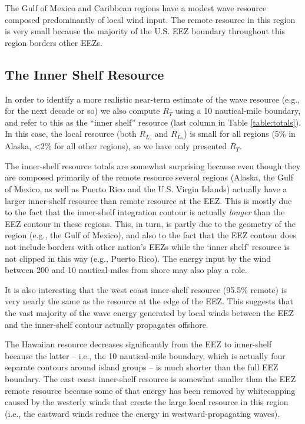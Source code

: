The Gulf of Mexico and Caribbean regions have a modest wave resource composed predominantly of local wind input. The remote resource in this region is very small because the majority of the U.S. EEZ boundary throughout this region borders other EEZs. 

\subsection{The Inner Shelf Resource}

In order to identify a more realistic near-term estimate of the wave resource (e.g., for the next decade or so) we also compute $R_T$ using a 10 nautical-mile boundary, and refer to this as the ``inner shelf'' resource (last column in Table \ref{table:totals}). In this case, the local resource (both $R_{L_\circ}$ and $R_{L_*}$) is small for all regions (5\% in Alaska, <2\% for all other regions), so we have only presented $R_T$.

The inner-shelf resource totals are somewhat surprising because even though they are composed primarily of the remote resource several regions (Alaska, the Gulf of Mexico, as well as Puerto Rico and the U.S. Virgin Islands) actually have a larger inner-shelf resource than remote resource at the EEZ. This is mostly due to the fact that the inner-shelf integration contour is actually {\em longer} than the EEZ contour in these regions. This, in turn, is partly due to the geometry of the region (e.g., the Gulf of Mexico), and also to the fact that the EEZ contour does not include borders with other nation's EEZs while the `inner shelf' resource is not clipped in this way (e.g., Puerto Rico). The energy input by the wind between 200 and 10 nautical-miles from shore may also play a role. 

It is also interesting that the west coast inner-shelf resource (95.5\% remote) is very nearly the same as the resource at the edge of the EEZ. This suggests that the vast majority of the wave energy generated by local winds between the EEZ and the inner-shelf contour actually propagates offshore.

The Hawaiian resource decreases significantly from the EEZ to inner-shelf because the latter -- i.e., the 10 nautical-mile boundary, which is actually four separate contours around island groups -- is much shorter than the full EEZ boundary. The east coast inner-shelf resource is somewhat smaller than the EEZ remote resource because some of that energy has been removed by whitecapping caused by the westerly winds that create the large local resource in this region (i.e., the eastward winds reduce the energy in westward-propagating waves).

